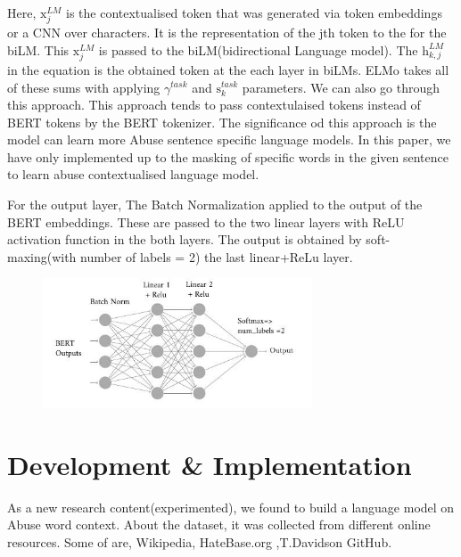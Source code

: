 \documentclass{article}
\begin{document}
Here, $\mathrm{x}_{j}^{LM}$ is the contextualised token that was generated via token embeddings or a CNN over characters. It is the representation of the jth token to the for the biLM\cite{amrami2018word}. This $\mathrm{x}_{j}^{LM}$ is passed to the biLM(bidirectional Language model). The $\mathrm{h}_{k,j}^{LM}$ in the equation is the obtained token at the each layer in biLMs. ELMo takes all of these sums with applying $\gamma^{task}$ and $\mathrm{s}_{k}^{task}$ parameters. We can also go through this approach. This approach tends to pass contextulaised tokens instead of BERT tokens by the BERT tokenizer. The significance od this approach is the model can learn more Abuse sentence specific language models. In this paper, we have only implemented up to the masking of specific words in the given sentence to learn abuse contextualised language model.

For the output layer, The Batch Normalization\cite{bjorck2018understanding} applied to the output of the BERT embeddings. These are passed to the two linear layers with ReLU activation function in the both layers. The output is obtained by soft-maxing(with number of labels = 2) the last linear+ReLu layer.

\begin{figure}[h]
\includegraphics[width=8cm]{images/OutputlayerMod.jpg}
\caption{}
\label{fig:AttentionFig}
\end{figure}

\section{Development \& Implementation}
As a new research content(experimented), we found to build a language model on Abuse word  context. About the dataset, it was collected from different online resources. Some of are, Wikipedia, HateBase.org ,T.Davidson GitHub.
\end{document}
